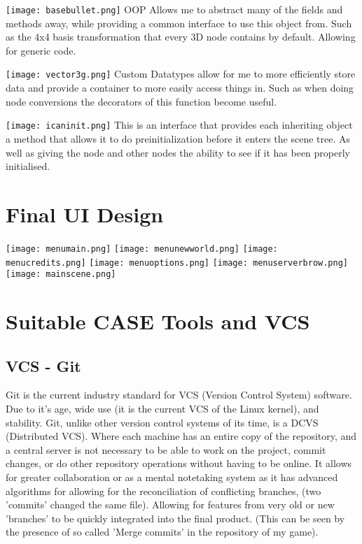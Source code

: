\documentclass[12pt, DIV=calc]{scrartcl}
\begin{document}
\texttt{[image: basebullet.png]}
OOP Allows me to abstract many of the fields and methods away, while providing a common interface to use this object from. Such as the 4x4 basis transformation that every 3D node contains by default. Allowing for generic code.

\texttt{[image: vector3g.png]}
Custom Datatypes allow for me to more efficiently store data and provide a container to more easily access things in. Such as when doing node conversions the decorators of this function become useful.


\texttt{[image: icaninit.png]}
This is an interface that provides each inheriting object a method that allows it to do preinitialization before it enters the scene tree. As well as giving the node and other nodes the ability to see if it has been properly initialised. 




\clearpage
\section{Final UI Design}
\texttt{[image: menumain.png]}
\texttt{[image: menunewworld.png]}
\texttt{[image: menucredits.png]}
\texttt{[image: menuoptions.png]}
\texttt{[image: menuserverbrow.png]}
\texttt{[image: mainscene.png]}


\clearpage
\section{Suitable CASE Tools and VCS}
\subsection{VCS - Git}
Git is the current industry standard for VCS (Version Control System) software. Due to it's age, wide use (it is the current VCS of the Linux kernel), and stability. Git, unlike other version control systems of its time, is a DCVS (Distributed VCS). Where each machine has an entire copy of the repository, and a central server is not necessary to be able to work on the project, commit changes, or do other repository operations without having to be online. It allows for greater collaboration or as a mental notetaking system as it has advanced algorithms for allowing for the reconciliation of conflicting branches, (two 'commits' changed the same file). Allowing for features from very old or new 'branches' to be quickly integrated into the final product. (This can be seen by the presence of so called 'Merge commits' in the repository of my game). \\
\end{document}
